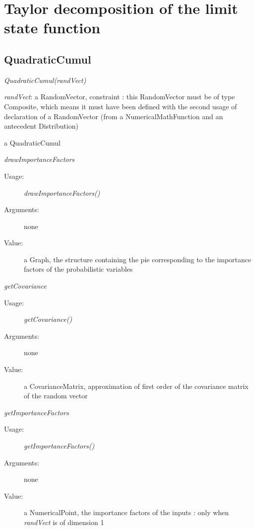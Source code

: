 \newpage
{}
\section{Taylor decomposition of the limit state function}

\subsection{QuadraticCumul}
\begin{description}

\item[Usage:]  \textit{QuadraticCumul(randVect)}

\item[Arguments:]  \textit{randVect}: a RandomVector, constraint : this RandomVector must be of type Composite, which means it must have been defined with the second usage of declaration of a RandomVector (from a NumericalMathFunction and an antecedent Distribution)

\item[Value:] a QuadraticCumul

\item[Some methods :]  \rule{0pt}{1em}

\begin{description}

\item \textit{drawImportanceFactors}
\begin{description}
\item[Usage:] \textit{drawImportanceFactors()}
\item[Arguments:] none
\item[Value:] a Graph, the structure containing the pie corresponding to the importance factors of the probabilistic variables
\end{description}
\bigskip

\item \textit{getCovariance}
\begin{description}
\item[Usage:] \textit{getCovariance()}
\item[Arguments:] none
\item[Value:] a CovarianceMatrix, approximation of first order of the covariance matrix of the random vector
\end{description}
\bigskip

\item \textit{getImportanceFactors}
\begin{description}
\item[Usage:] \textit{getImportanceFactors()}
\item[Arguments:] none
\item[Value:] a NumericalPoint, the importance factors of the inputs : only when \textit{randVect} is of dimension 1
\end{description}


\end{description}
\end{description}
